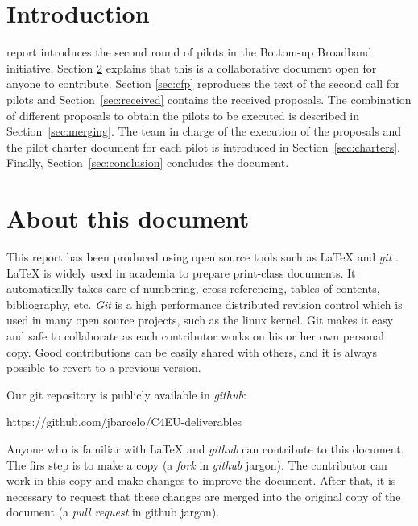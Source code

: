 \documentclass[draftclsnofoot,12pt,journal,onecolumn]{IEEEtran}
\begin{document}
\section{Introduction}
% 
% 
% 
% 
 report introduces the second round of pilots in the Bottom-up Broadband initiative.
Section \ref{sec:about} explains that this is a collaborative document open for anyone to contribute.
Section \ref{sec:cfp} reproduces the text of the second call for pilots and Section~\ref{sec:received} contains the received proposals.
The combination of different proposals to obtain the pilots to be executed is described in Section~\ref{sec:merging}.
The team in charge of the execution of the proposals and the pilot charter document for each pilot is introduced in Section~\ref{sec:charters}.
Finally, Section~\ref{sec:conclusion} concludes the document.


\section{About this document}
\label{sec:about}

This report has been produced using open source tools such as {\LaTeX} \cite{lamport1994ldp} and \emph{git} \cite{chacon2009pg}.
{\LaTeX} is widely used in academia to prepare print-class documents.
It automatically takes care of numbering, cross-referencing, tables of contents, bibliography, etc.
\emph{Git} is a high performance distributed revision control which is used in many open source projects, such as the linux kernel.
Git makes it easy and safe to collaborate as each contributor works on his or her own personal copy.
Good contributions can be easily shared with others, and it is always possible to revert to a previous version.

Our git repository is publicly available in \emph{github}:

https://github.com/jbarcelo/C4EU-deliverables

Anyone who is familiar with {\LaTeX} and \emph{github} can contribute to this document.
The firs step is to make a copy (a \emph{fork} in \emph{github} jargon).
The contributor can work in this copy and make changes to improve the document.
After that, it is necessary to request that these changes are merged into the original copy of the document (a \emph{pull request} in github jargon).
\end{document}
